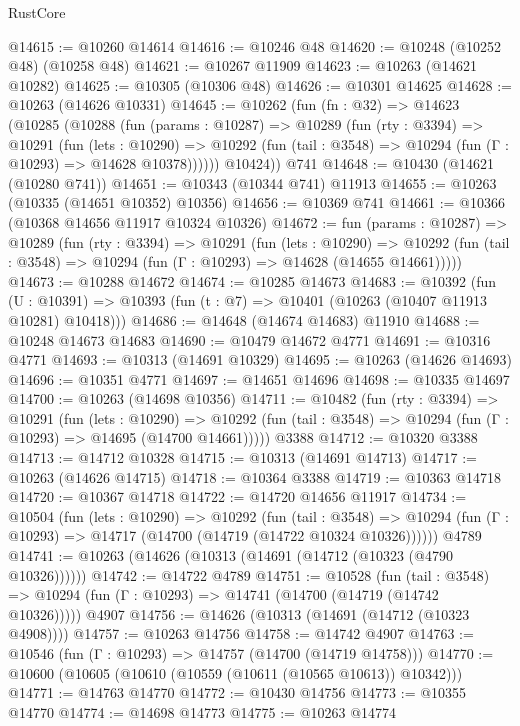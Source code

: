 \begin{lexlean}{RustCore}
\begin{coremodule}
@14615 := @10260 @14614
@14616 := @10246 @48
@14620 := @10248 (@10252 @48) (@10258 @48)
@14621 := @10267 @11909
@14623 := @10263 (@14621 @10282)
@14625 := @10305 (@10306 @48)
@14626 := @10301 @14625
@14628 := @10263 (@14626 @10331)
@14645 := @10262
    (fun (fn : @32) =>
    @14623
      (@10285
        (@10288
          (fun (params : @10287) =>
          @10289
            (fun (rty : @3394) =>
            @10291
              (fun (lets : @10290) =>
              @10292 (fun (tail : @3548) => @10294 (fun (Γ : @10293) => @14628 @10378))))))
        @10424))
    @741
@14648 := @10430 (@14621 (@10280 @741))
@14651 := @10343 (@10344 @741) @11913
@14655 := @10263 (@10335 (@14651 @10352) @10356)
@14656 := @10369 @741
@14661 := @10366 (@10368 @14656 @11917 @10324 @10326)
@14672 := fun (params : @10287) =>
  @10289
    (fun (rty : @3394) =>
    @10291
      (fun (lets : @10290) =>
      @10292 (fun (tail : @3548) => @10294 (fun (Γ : @10293) => @14628 (@14655 @14661)))))
@14673 := @10288 @14672
@14674 := @10285 @14673
@14683 := @10392
    (fun (U : @10391) => @10393 (fun (t : @7) => @10401 (@10263 (@10407 @11913 @10281) @10418)))
@14686 := @14648 (@14674 @14683) @11910
@14688 := @10248 @14673 @14683
@14690 := @10479 @14672 @4771
@14691 := @10316 @4771
@14693 := @10313 (@14691 @10329)
@14695 := @10263 (@14626 @14693)
@14696 := @10351 @4771
@14697 := @14651 @14696
@14698 := @10335 @14697
@14700 := @10263 (@14698 @10356)
@14711 := @10482
    (fun (rty : @3394) =>
    @10291
      (fun (lets : @10290) =>
      @10292 (fun (tail : @3548) => @10294 (fun (Γ : @10293) => @14695 (@14700 @14661)))))
    @3388
@14712 := @10320 @3388
@14713 := @14712 @10328
@14715 := @10313 (@14691 @14713)
@14717 := @10263 (@14626 @14715)
@14718 := @10364 @3388
@14719 := @10363 @14718
@14720 := @10367 @14718
@14722 := @14720 @14656 @11917
@14734 := @10504
    (fun (lets : @10290) =>
    @10292
      (fun (tail : @3548) =>
      @10294 (fun (Γ : @10293) => @14717 (@14700 (@14719 (@14722 @10324 @10326))))))
    @4789
@14741 := @10263 (@14626 (@10313 (@14691 (@14712 (@10323 (@4790 @10326))))))
@14742 := @14722 @4789
@14751 := @10528
    (fun (tail : @3548) => @10294 (fun (Γ : @10293) => @14741 (@14700 (@14719 (@14742 @10326)))))
    @4907
@14756 := @14626 (@10313 (@14691 (@14712 (@10323 @4908))))
@14757 := @10263 @14756
@14758 := @14742 @4907
@14763 := @10546 (fun (Γ : @10293) => @14757 (@14700 (@14719 @14758)))
@14770 := @10600 (@10605 (@10610 (@10559 (@10611 (@10565 @10613)) @10342)))
@14771 := @14763 @14770
@14772 := @10430 @14756
@14773 := @10355 @14770
@14774 := @14698 @14773
@14775 := @10263 @14774

\end{coremodule}
\end{lexlean}
